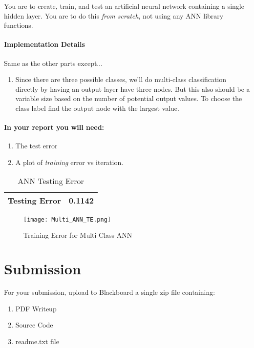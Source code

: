 \documentclass[12pt]{article}
\begin{document}
\noindent
You are to create, train, and test an artificial neural network containing a single hidden layer.  You are to do this \emph{from scratch}, not using any ANN library functions.

\paragraph{Implementation Details}
Same as the other parts except...
\begin{enumerate}
\item Since there are three possible classes, we'll do multi-class classification directly by having an output layer have three nodes.  But this also should be a variable size based on the number of potential output values.   To choose the class label find the output node with the largest value.
\end{enumerate}


\paragraph{In your report you will need:}
\begin{enumerate}
\item The test error
\item A plot of \emph{training} error vs iteration.
\end{enumerate}

\begin{table}[h]
\begin{center}
\begin{tabular}{|l|l|}
\hline
Testing Error & 0.1142\\
\hline
\end{tabular}
\caption{ANN Testing Error}
\end{center}
\end{table}

\begin{figure}[H]
\begin{center}
\texttt{[image: Multi\_ANN\_TE.png]}
\caption{Training Error for Multi-Class ANN}
\end{center}
\end{figure}


\newpage
\section*{Submission}
For your submission, upload to Blackboard a single zip file containing:

\begin{enumerate}
\item PDF Writeup
\item Source Code
\item readme.txt file
\end{enumerate}
\end{document}
